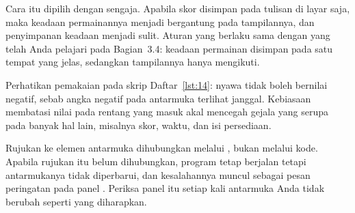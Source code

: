 Cara itu dipilih dengan sengaja. Apabila skor disimpan pada tulisan di layar
saja, maka keadaan permainannya menjadi bergantung pada tampilannya, dan
penyimpanan keadaan menjadi sulit. Aturan yang berlaku sama dengan yang telah
Anda pelajari pada Bagian~3.4: keadaan permainan disimpan pada satu tempat
yang jelas, sedangkan tampilannya hanya mengikuti.

\begin{tipsbox}
Perhatikan pemakaian  pada skrip Daftar~\ref{lst:14}: nyawa tidak boleh bernilai negatif, sebab angka negatif pada
antarmuka terlihat janggal. Kebiasaan membatasi nilai pada rentang yang masuk
akal mencegah gejala yang serupa pada banyak hal lain, misalnya skor, waktu,
dan isi persediaan.
\end{tipsbox}

\begin{catatabox}
Rujukan ke elemen antarmuka dihubungkan melalui , bukan
melalui kode. Apabila rujukan itu belum dihubungkan, program tetap berjalan
tetapi antarmukanya tidak diperbarui, dan kesalahannya muncul sebagai pesan
peringatan pada panel . Periksa panel itu setiap kali
antarmuka Anda tidak berubah seperti yang diharapkan.
\end{catatabox}
